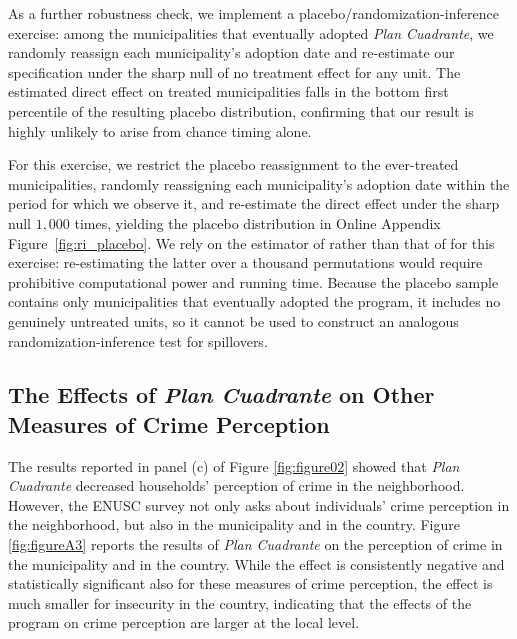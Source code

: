 As a further robustness check, we implement a placebo/randomization-inference exercise: among the municipalities that eventually adopted \emph{Plan Cuadrante}, we randomly reassign each municipality's adoption date and re-estimate our specification under the sharp null of no treatment effect for any unit. The estimated direct effect on treated municipalities falls in the bottom first percentile of the resulting placebo distribution, confirming that our result is highly unlikely to arise from chance timing alone.

For this exercise, we restrict the placebo reassignment to the ever-treated municipalities, randomly reassigning each municipality's adoption date within the period for which we observe it, and re-estimate the direct effect under the sharp null $1{,}000$ times, yielding the placebo distribution in Online Appendix Figure~\ref{fig:ri_placebo}. We rely on the estimator of \citet{Chaisemartin} rather than that of \citet{Callaway} for this exercise: re-estimating the latter over a thousand permutations would require prohibitive computational power and running time. Because the placebo sample contains only municipalities that eventually adopted the program, it includes no genuinely untreated units, so it cannot be used to construct an analogous randomization-inference test for spillovers.


\clearpage

\subsection{The Effects of \emph{Plan Cuadrante} on Other Measures of Crime Perception}

The results reported in panel (c) of Figure \ref{fig:figure02} showed that \emph{Plan Cuadrante} decreased households' perception of crime in the neighborhood. However, the ENUSC survey not only asks about individuals' crime perception in the neighborhood, but also in the municipality and in the country. Figure \ref{fig:figureA3} reports the results of \emph{Plan Cuadrante} on the perception of crime in the municipality and in the country. While the effect is consistently negative and statistically significant also for these measures of crime perception, the effect is much smaller for insecurity in the country, indicating that the effects of the program on crime perception are larger at the local level.


\clearpage

